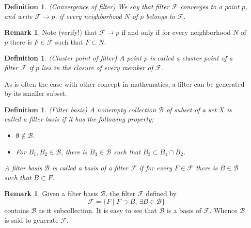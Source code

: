 \documentclass[a4paper,12pt]{article}
\newtheorem{dfn}[thm]{Definition}
\theoremstyle{remark}
\theoremstyle{definition}
\newtheorem{rem}[thm]{Remark}
\theoremstyle{definition}
\theoremstyle{definition}
\begin{document}
\begin{dfn} (Convergence of filter)
	We say that filter \( \mathscr{F} \) converges to a point \( p \), and write \( \mathscr{F} \to p \), if every neighborhood \( N \) of \( p \) belongs to \( \mathscr{F} \).
\end{dfn}

\begin{rem}\label{rem filter convergence}
	Note (verify!) that \( \mathscr{F} \to p \) if and only if for every neighborhood \( N \) of \( p \) there is \( F \in \mathscr{F} \) such that \( F \subset N \).
\end{rem}

\begin{dfn} (Cluster point of filter)
	A point \( p \) is called a cluster point of a filter \( \mathscr{F} \) if \( p \) lies in the closure of every member of \( \mathscr{F} \).
\end{dfn}

As is often the case with other concept in mathematics, a filter can be generated by its smaller subset.
\begin{dfn} (Filter basis)
	A nonempty collection \( \mathscr{B} \) of subset of a set \( X \) is called a filter basis if it has the following property;
	\begin{itemize}
		\item[(1)] \( \emptyset \notin \mathscr{B} \).
		\item[(2)] For \( B_1, B_2 \in \mathscr{B} \), there is \( B_3 \in \mathscr{B} \) such that \( B_3 \subset B_1 \cap B_2 \).
	\end{itemize}

	A filter basis \( \mathscr{B} \) is called a basis of a filter \( \mathscr{F}  \) if for every \( F \in \mathscr{F} \) there is \( B \in \mathscr{B} \) such that \( B \subset F \).
\end{dfn}



\begin{rem}
	Given a filter basis \( \mathscr{B} \), the filter \( \mathscr{F} \) defined by
	\begin{equation*}
		\mathscr{F} = \{F \mid F \supset B,\,\exists B \in \mathscr{B}\}
	\end{equation*}
	contains \( \mathscr{B} \) as it subcollection. It is easy to see that \( \mathscr{B} \) is a basis of \( \mathscr{F} \). Whence \( \mathscr{B} \) is said to generate \( \mathscr{F} \).
\end{rem}
\end{document}
